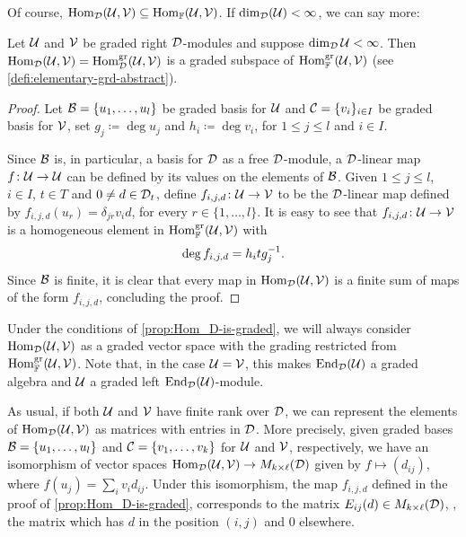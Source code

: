 Of course, $\operatorname{Hom}_{\mathcal{D}}(\mathcal U,\mathcal V) \subseteq \operatorname{Hom}_{\mathbb{F}} (\mathcal U, \mathcal V)$. 
If $\dim_{\mathcal{D}} (\mathcal U) < \infty$, we can say more: 

\begin{prop}\label{prop:Hom_D-is-graded}
    Let $\mathcal U$ and $\mathcal V$ be graded right $\mathcal{D}$-modules and suppose $\dim_{\mathcal{D}} \mathcal U < \infty$. 
    Then $\operatorname{Hom}_{\mathcal{D}}(\mathcal U,\mathcal V) = \operatorname{Hom}_{\mathcal{D}}^{\mathrm{gr}} (\mathcal U, \mathcal V)$ is a graded subspace of $\operatorname{Hom}_{\mathbb{F}}^{\mathrm{gr}} (\mathcal U, \mathcal V)$ (see \cref{defi:elementary-grd-abstract}).
\end{prop}

\begin{proof}
    Let $\mathcal B = \{ u_1, \ldots, u_l \}$ be graded basis for $\mathcal U$ and $\mathcal C = \{v_i\}_{i\in I}$ be graded basis for $\mathcal V$, set $g_j \coloneqq \deg u_j$ and $h_i \coloneqq \deg v_i$, for $1\leq j \leq l$ and $i\in I$. 
    
    Since $\mathcal B$ is, in particular, a basis for $\mathcal{D}$ as a free $\mathcal{D}$-module, a $\mathcal{D}$-linear map $f\colon \mathcal U \to \mathcal U$ can be defined by its values on the elements of $\mathcal B$. 
    Given $1\leq j \leq l$, $i\in I$, $t\in T$ and $0\neq d \in \mathcal{D}_t$, define $f_{i, j, d}\colon \mathcal U \to \mathcal V$ to be the $\mathcal{D}$-linear map defined by $f_{i, j, d}(u_r) = \delta_{jr} v_i d$, for every $r \in \{1, \ldots, l \}$. 
    It is easy to see that $f_{i, j, d}\colon \mathcal U \to \mathcal V$ is a homogeneous element in $\operatorname{Hom}_{\mathbb{F}}^{\mathrm{gr}} (\mathcal U, \mathcal V)$ with
    \[\label{eq:grd-M_k(D)-nonabelian}
        \deg f_{i,j,d} = h_i t g_j^{-1}.
    \] 
    Since $\mathcal B$ is finite, it is clear that every map in $\operatorname{Hom}_{\mathcal{D}} (\mathcal U, \mathcal V)$ is a finite sum of maps of the form $f_{i, j, d}$, concluding the proof. 
\end{proof}

Under the conditions of \cref{prop:Hom_D-is-graded}, we will always consider $\operatorname{Hom}_{\mathcal{D}} (\mathcal U, \mathcal V)$ as a graded vector space with the grading restricted from $\operatorname{Hom}_{\mathbb{F}}^{\mathrm{gr}} (\mathcal U, \mathcal V)$. 
Note that, in the case $\mathcal U = \mathcal V$, this makes $\operatorname{End}_{\mathcal{D}} (\mathcal U)$ a graded algebra and $\mathcal U$ a graded left $\operatorname{End}_{\mathcal{D}} (\mathcal U)$-module. 


As usual, if both $\mathcal U$ and $\mathcal V$ have finite rank over $\mathcal{D}$, we can represent the elements of $\operatorname{Hom}_{\mathcal{D}}(\mathcal U, \mathcal V)$ as matrices with entries in $\mathcal{D}$. 
More precisely, given graded bases $\mathcal B = \{ u_1, \ldots, u_l \}$ and $\mathcal C = \{v_1, \ldots, v_k\}$ for $\mathcal U$ and $\mathcal V$, respectively, we have an isomorphism of vector spaces $\operatorname{Hom}_{\mathcal{D}}(\mathcal U, \mathcal V) \to M_{k\times \ell}(\mathcal{D})$ given by $f\mapsto (d_{ij})$, where $f(u_j) = \sum_i v_i d_{ij}$. 
Under this isomorphism, the map $f_{i, j, d}$ defined in the proof of \cref{prop:Hom_D-is-graded}, corresponds to the matrix $E_{ij}(d) \in M_{k\times \ell}(\mathcal{D})$, \ie, the matrix which has $d$ in the position $(i,j)$ and $0$ elsewhere. 

